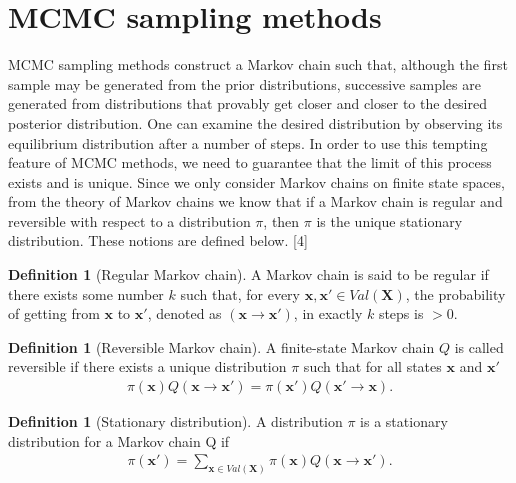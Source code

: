\documentclass[a4paper, twoside, 11pt]{report}
\theoremstyle{plain}
\theoremstyle{definition}
\newtheorem{definition}[thm]{Definition}
\theoremstyle{remark}
\newcommand{\bfx}{{\mathbf{x}}}
\newcommand{\bfX}{{\mathbf{X}}}
\begin{document}
\section{MCMC sampling methods}
MCMC sampling methods construct a Markov chain such that, although the first sample may be generated from the prior distributions, successive samples are generated from distributions that provably get closer and closer to the desired posterior distribution. One can examine the desired distribution by observing its equilibrium distribution after a number of steps. In order to use this tempting feature of MCMC methods, we need to guarantee that the limit of this process exists and is unique. Since we only consider Markov chains on finite state spaces, from the theory of Markov chains we know that if a Markov chain is regular and reversible with respect to a distribution $\pi$, then $\pi$ is the unique stationary distribution. These notions are defined below. [4]


\begin{definition}[Regular Markov chain]
A Markov chain is said to be regular if there exists some number $k$ such that, for every $\bfx, \bfx' \in Val(\bfX)$, the probability of getting from $\bfx$ to $\bfx'$, denoted as $(\bfx \to \bfx')$, in exactly $k$ steps is $> 0$. 
\end{definition}

\begin{definition}[Reversible Markov chain]
A finite-state Markov chain $Q$ is called reversible if there exists a unique distribution $\pi$ such that for all states $\bfx$ and $\bfx'$
\begin{align}
\pi(\bfx) Q(\bfx \to \bfx') = \pi(\bfx') Q(\bfx' \to \bfx).
\end{align}
\end{definition}

\begin{definition}[Stationary distribution]
A distribution $\pi$ is a stationary distribution for a Markov chain Q if
\begin{align}
\pi(\bfx') = \sum_{\bfx \in Val(\bfX)} \pi(\bfx) Q(\bfx \to \bfx').
\end{align}

\end{definition}
\end{document}
